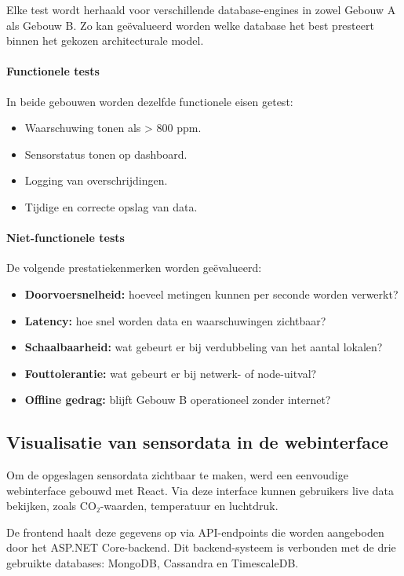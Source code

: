 Elke test wordt herhaald voor verschillende database-engines in zowel Gebouw A als Gebouw B. Zo kan geëvalueerd worden welke database het best presteert binnen het gekozen architecturale model.

\paragraph{Functionele tests}
In beide gebouwen worden dezelfde functionele eisen getest:
\begin{itemize}
    \item Waarschuwing tonen als  > 800 ppm.
    \item Sensorstatus tonen op dashboard.
    \item Logging van overschrijdingen.
    \item Tijdige en correcte opslag van data.
\end{itemize}

\paragraph{Niet-functionele tests}
De volgende prestatiekenmerken worden geëvalueerd:
\begin{itemize}
    \item \textbf{Doorvoersnelheid:} hoeveel metingen kunnen per seconde worden verwerkt?
    \item \textbf{Latency:} hoe snel worden data en waarschuwingen zichtbaar?
    \item \textbf{Schaalbaarheid:} wat gebeurt er bij verdubbeling van het aantal lokalen?
    \item \textbf{Fouttolerantie:} wat gebeurt er bij netwerk- of node-uitval?
    \item \textbf{Offline gedrag:} blijft Gebouw B operationeel zonder internet?
\end{itemize}

\subsection{Visualisatie van sensordata in de webinterface}

Om de opgeslagen sensordata zichtbaar te maken, werd een eenvoudige webinterface gebouwd met React. Via deze interface kunnen gebruikers live data bekijken, zoals CO₂-waarden, temperatuur en luchtdruk.

De frontend haalt deze gegevens op via API-endpoints die worden aangeboden door het ASP.NET Core-backend. Dit backend-systeem is verbonden met de drie gebruikte databases: MongoDB, Cassandra en TimescaleDB.


